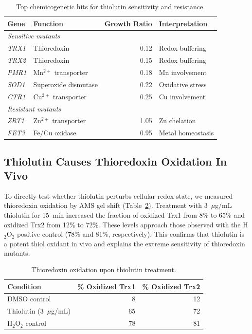\documentclass[11pt]{article}
\begin{document}
\begin{table}[ht]
\centering
\caption{Top chemicogenetic hits for thiolutin sensitivity and resistance.}
\label{tab:screen}
\begin{tabular}{llrl}
\toprule
\textbf{Gene} & \textbf{Function} & \textbf{Growth Ratio} & \textbf{Interpretation} \\
\midrule
\multicolumn{4}{l}{\textit{Sensitive mutants}} \\
\textit{TRX1} & Thioredoxin & 0.12 & Redox buffering \\
\textit{TRX2} & Thioredoxin & 0.15 & Redox buffering \\
\textit{PMR1} & Mn$^{2+}$ transporter & 0.18 & Mn involvement \\
\textit{SOD1} & Superoxide dismutase & 0.22 & Oxidative stress \\
\textit{CTR1} & Cu$^{2+}$ transporter & 0.25 & Cu involvement \\
\midrule
\multicolumn{4}{l}{\textit{Resistant mutants}} \\
\textit{ZRT1} & Zn$^{2+}$ transporter & 1.05 & Zn chelation \\
\textit{FET3} & Fe/Cu oxidase & 0.95 & Metal homeostasis \\
\bottomrule
\end{tabular}
\end{table}

\subsection{Thiolutin Causes Thioredoxin Oxidation In Vivo}

To directly test whether thiolutin perturbs cellular redox state, we measured thioredoxin oxidation by AMS gel shift (Table~\ref{tab:trx}). Treatment with 3~$\mu$g/mL thiolutin for 15~min increased the fraction of oxidized Trx1 from 8\% to 65\% and oxidized Trx2 from 12\% to 72\%. These levels approach those observed with the H$_2$O$_2$ positive control (78\% and 81\%, respectively). This confirms that thiolutin is a potent thiol oxidant in vivo and explains the extreme sensitivity of thioredoxin mutants.

\begin{table}[ht]
\centering
\caption{Thioredoxin oxidation upon thiolutin treatment.}
\label{tab:trx}
\begin{tabular}{lrr}
\toprule
\textbf{Condition} & \textbf{\% Oxidized Trx1} & \textbf{\% Oxidized Trx2} \\
\midrule
DMSO control & 8 & 12 \\
Thiolutin (3~$\mu$g/mL) & 65 & 72 \\
H$_2$O$_2$ control & 78 & 81 \\
\bottomrule
\end{tabular}
\end{table}
\end{document}
